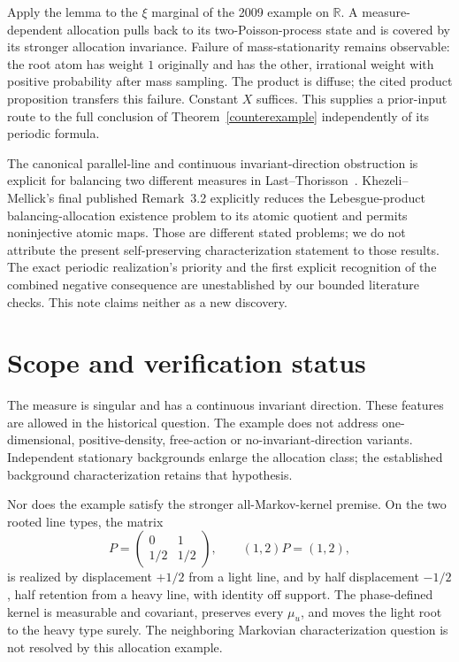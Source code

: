 \documentclass[11pt]{article}
\newcommand{\R}{\mathbb R}
\begin{document}
Apply the lemma to the $\xi$ marginal of the 2009 example on $\R$. A measure-dependent allocation pulls back to its two-Poisson-process state and is covered by its stronger allocation invariance. Failure of mass-stationarity remains observable: the root atom has weight $1$ originally and has the other, irrational weight with positive probability after mass sampling. The product is diffuse; the cited product proposition transfers this failure. Constant $X$ suffices. This supplies a prior-input route to the full conclusion of Theorem~\ref{counterexample} independently of its periodic formula.

The canonical parallel-line and continuous invariant-direction obstruction is explicit for balancing two different measures in Last--Thorisson~\cite[\S8 and Remark~8.1]{LT23}. Khezeli--Mellick's final published Remark~3.2 \cite{KM25} explicitly reduces the Lebesgue-product balancing-allocation existence problem to its atomic quotient and permits noninjective atomic maps. Those are different stated problems; we do not attribute the present self-preserving characterization statement to those results. The exact periodic realization's priority and the first explicit recognition of the combined negative consequence are unestablished by our bounded literature checks. This note claims neither as a new discovery.

\section{Scope and verification status}

The measure is singular and has a continuous invariant direction. These features are allowed in the historical question. The example does not address one-dimensional, positive-density, free-action or no-invariant-direction variants. Independent stationary backgrounds enlarge the allocation class; the established background characterization \cite[Theorem~7]{LT15} retains that hypothesis.

Nor does the example satisfy the stronger all-Markov-kernel premise. On the two rooted line types, the matrix
\[
 P=\begin{pmatrix}0&1\\1/2&1/2\end{pmatrix},\qquad (1,2)P=(1,2),
\]
is realized by displacement $+1/2$ from a light line, and by half displacement $-1/2$, half retention from a heavy line, with identity off support. The phase-defined kernel is measurable and covariant, preserves every $\mu_u$, and moves the light root to the heavy type surely. The neighboring Markovian characterization question is not resolved by this allocation example.
\end{document}
